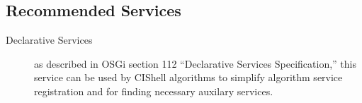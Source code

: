 \subsection*{Recommended Services}
\begin{description}
  \item[Declarative Services] as described in OSGi section 112 ``Declarative
  Services Specification,'' this service can be used by CIShell algorithms to
  simplify algorithm service registration and for finding necessary auxilary services.
\end{description}
